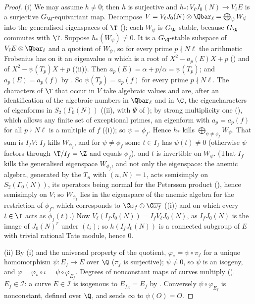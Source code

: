 \begin{proof}
(i) We may assume $h\ne0$; then $h$ is surjective and $h_*\colon V_\ell J_0(N)\to V_\ell E$ is a surjective $G_\Q$-equivariant map. Decompose
$V=V_\ell J_0(N)\otimes\Qbar_\ell=\bigoplus_\psi W_\psi$ into the generalised eigenspaces of $\T$ (); each $W_\psi$ is $G_\Q$-stable, because $G_\Q$ commutes with $\T$. Suppose
$h_*(W_\psi)\ne0$. It is a $G_\Q$-stable subspace of $V_\ell E\otimes\Qbar_\ell$ and a quotient of $W_\psi$, so for every prime $p\nmid N\ell$ the arithmetic Frobenius has on it an eigenvalue
$\alpha$ which is a root of $X^2-a_p(E)X+p$ () and of $X^2-\psi(T_p)X+p$ ((ii)). Then $a_p(E)=\alpha+p/\alpha=\psi(T_p)$; and $a_p(E)=a_p(f)$
by . So $\psi(T_p)=a_p(f)$ for every prime $p\nmid N\ell$. The characters of $\T$ that occur in $V$ take algebraic values and are, after
an identification of the algebraic numbers in $\Qbar_\ell$ and in $\C$, the eigencharacters of eigenforms in $S_2(\Gamma_0(N))$ ((ii), with $\Psi$ of
); by strong multiplicity one (), which allows any finite set of exceptional primes, an eigenform with $a_p=a_p(f)$ for all
$p\nmid N\ell$ is a multiple of $f$ ((i)); so $\psi=\phi_f$. Hence $h_*$ kills
$\bigoplus_{\psi\ne\phi_f}W_\psi$. That sum is $I_fV$: $I_f$ kills $W_{\phi_f}$, and for $\psi\ne\phi_f$ some $t\in I_f$ has $\psi(t)\ne0$ (otherwise $\psi$ factors through $\T/I_f=\Z$ and equals
$\phi_f$), and $t$ is invertible on $W_\psi$. (That $I_f$ kills the generalised eigenspace $W_{\phi_f}$, and not only the eigenspace: the anemic algebra, generated by
the $T_n$ with $(n,N)=1$, acts semisimply on $S_2(\Gamma_0(N))$, its operators being normal for the Petersson product (), hence semisimply on $V$; so
$W_{\phi_f}$ lies in the eigenspace of the anemic algebra for the restriction of $\phi_f$, which corresponds to $\C\omega_f\oplus\C\overline{\omega_f}$
((i)) and on which every $t\in\T$ acts as $\phi_f(t)$.) Now $V_\ell(I_fJ_0(N))=I_fV_\ell J_0(N)$, as $I_fJ_0(N)$ is the image of $J_0(N)^r$ under $(t_i)$; so $h(I_fJ_0(N))$ is a connected
subgroup of $E$ with trivial rational Tate module, hence $0$.

(ii) By (i) and the universal property of the quotient, $\varphi_*=\psi\circ\pi_f$ for a unique homomorphism $\psi\colon E_f\to E$ over $\Q$ ($\pi_f$ is surjective); $\psi\ne0$, so $\psi$ is an
isogeny, and $\varphi=\varphi_*\circ\iota=\psi\circ\varphi_{E_f}$. Degrees of nonconstant maps of curves multiply (). $E_f\in\mathcal I$: a curve $E\in\mathcal I$ is isogenous to
$E_{f_E}=E_f$ by . Conversely $\psi\circ\varphi_{E_f}$ is nonconstant, defined over $\Q$, and sends $\infty$ to $\psi(O)=O$.


\end{proof}
